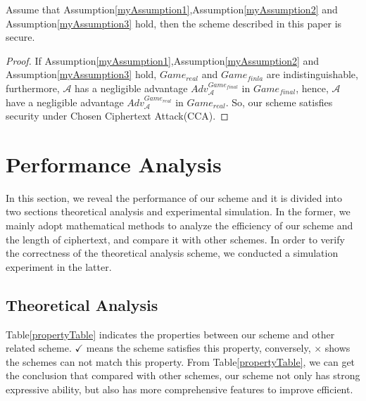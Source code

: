 \documentclass[smallextended]{svjour3}       %
\begin{document}
\begin{myDefinition}
	Assume that Assumption\ref{myAssumption1},Assumption\ref{myAssumption2} and Assumption\ref{myAssumption3} hold, then the scheme described in this paper is secure.
\end{myDefinition}
\begin{proof}
	If Assumption\ref{myAssumption1},Assumption\ref{myAssumption2} and Assumption\ref{myAssumption3} hold, $Game_{real}$ and $Game_{finla}$ are indistinguishable, furthermore, $\mathcal{A}$ has a negligible advantage $Adv_{\mathcal{A}}^{Game_{final}}$ in $Game_{final}$, hence, $\mathcal{A}$ have a negligible advantage $Adv_{\mathcal{A}}^{Game_{real}}$ in $Game_{real}$. So, our scheme satisfies security under Chosen Ciphertext Attack(CCA). 
\end{proof}
\section{Performance Analysis}\label{section5}
In this section, we reveal the performance of our scheme and it is divided into two sections theoretical analysis and experimental simulation. 
In the former, we mainly adopt mathematical methods to analyze the efficiency of our scheme and the length of ciphertext, and compare it with other schemes. 
In order to verify the correctness of the theoretical analysis scheme, we conducted a simulation experiment in the latter. 
\subsection{Theoretical Analysis}

Table\ref{propertyTable} indicates the properties between our scheme and other related scheme. 
$\checkmark$ means the scheme satisfies this property, conversely, $\times$ shows the schemes can not match this property. 
From Table\ref{propertyTable}, we can get the conclusion that compared with other schemes, our scheme not only has strong expressive ability, but also has more comprehensive features to improve efficient.  
\end{document}

